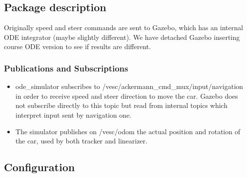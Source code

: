 \subsection{Package description}

Originally speed and steer commands are sent to Gazebo, which has an internal ODE integrator (maybe slightly different). We have detached Gazebo inserting course ODE version to see if results are different.

\subsubsection{Publications and Subscriptions}

\begin{itemize}
	\item ode\_simulator subscribes to /vesc/ackermann\_cmd\_mux/input/navigation in order to receive speed and steer direction to move the car. Gazebo does not subscribe directly to this topic but read from internal topics which interpret input sent by navigation one.
	\item The simulator publishes on /vesc/odom the actual position and rotation of the car, used by both tracker and linearizer.
\end{itemize}

\subsection{Configuration}

